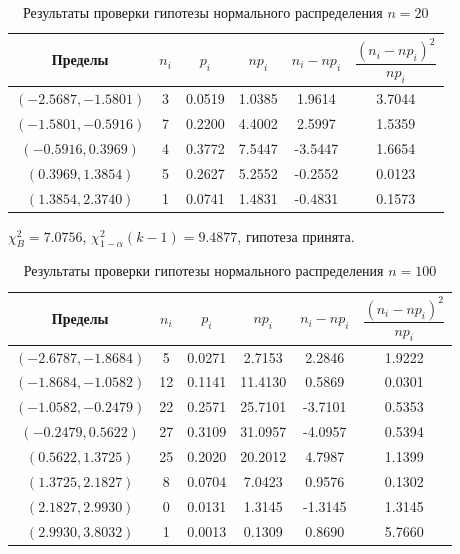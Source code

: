 \documentclass[12pt,a4paper]{article}
\begin{document}
	\begin{table}[htbp]
		\centering
		\begin{tabular}{ |c|c|c|c|c|c| }
			\hline
			Пределы & \( n_i \) & \( p_i \) & \( np_i \) & \( n_i - np_i \)
			& \( \dfrac{(n_i - np_i)^2}{np_i} \) \\
			\hline
			\( (-2.5687, -1.5801) \) & 3 & 0.0519 & 1.0385 & 1.9614 & 3.7044 \\
			\hline
			\( (-1.5801, -0.5916) \) & 7 & 0.2200 & 4.4002 & 2.5997 & 1.5359 \\
			\hline
			\( (-0.5916, 0.3969) \) & 4 & 0.3772 & 7.5447 & -3.5447 & 1.6654 \\
			\hline
			\( (0.3969, 1.3854) \) & 5 & 0.2627 & 5.2552 & -0.2552 & 0.0123 \\
			\hline
			\( (1.3854, 2.3740) \) & 1 & 0.0741 & 1.4831 & -0.4831 & 0.1573 \\
			\hline
		\end{tabular}
		\caption{Результаты проверки гипотезы нормального распределения
			\( n = 20 \)}
	\end{table}

	\( \chi_B^2 = 7.0756 \), \( \chi_{1 - \alpha}^2 (k - 1) = 9.4877 \),
	гипотеза принята.

	\begin{table}[htbp]
		\centering
		\begin{tabular}{ |c|c|c|c|c|c| }
			\hline
			Пределы & \( n_i \) & \( p_i \) & \( np_i \) & \( n_i - np_i \)
			& \( \dfrac{(n_i - np_i)^2}{np_i} \) \\
			\hline
			\( (-2.6787, -1.8684) \) & 5 & 0.0271 & 2.7153 & 2.2846 & 1.9222 \\
			\hline
			\( (-1.8684, -1.0582) \) & 12 & 0.1141 & 11.4130 & 0.5869 & 0.0301 \\
			\hline
			\( (-1.0582, -0.2479) \) & 22 & 0.2571 & 25.7101 & -3.7101 & 0.5353 \\
			\hline
			\( (-0.2479, 0.5622) \) & 27 & 0.3109 & 31.0957 & -4.0957 & 0.5394 \\
			\hline
			\( (0.5622, 1.3725) \) & 25 & 0.2020 & 20.2012 & 4.7987 & 1.1399 \\
			\hline
			\( (1.3725, 2.1827) \) & 8 & 0.0704 & 7.0423 & 0.9576 & 0.1302 \\
			\hline
			\( (2.1827, 2.9930) \) & 0 & 0.0131 & 1.3145 & -1.3145 & 1.3145 \\
			\hline
			\( (2.9930, 3.8032) \) & 1 & 0.0013 & 0.1309 & 0.8690 & 5.7660 \\
			\hline
		\end{tabular}
		\caption{Результаты проверки гипотезы нормального распределения
			\( n = 100 \)}
	\end{table}
\end{document}
